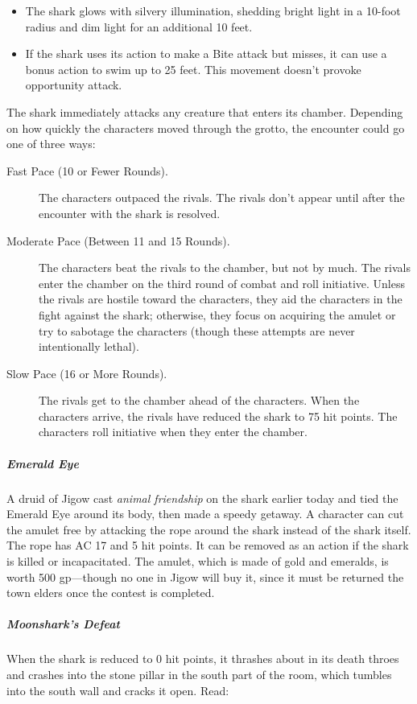 \documentclass[10pt,a4paper,twoside,fancy,bg=print,twocolumn,openany,nodeprecatedcode]{dndbook}
\begin{document}
\begin{itemize}
\item The shark glows with silvery illumination, shedding bright light in a 10-foot radius and dim light for an additional 10 feet.
\item If the shark uses its action to make a Bite attack but misses, it can use a bonus action to swim up to 25 feet. This movement doesn't provoke opportunity attack.
\end{itemize}

The shark immediately attacks any creature that enters its chamber. Depending on how quickly the characters moved through the grotto, the encounter could go one of three ways:


\begin{description}
\item[Fast Pace (10 or Fewer Rounds).]
The characters outpaced the rivals. The rivals don't appear until after the encounter with the shark is resolved.
\item[Moderate Pace (Between 11 and 15 Rounds).]
The characters beat the rivals to the chamber, but not by much. The rivals enter the chamber on the third round of combat and roll initiative. Unless the rivals are hostile toward the characters, they aid the characters in the fight against the shark; otherwise, they focus on acquiring the amulet or try to sabotage the characters (though these attempts are never intentionally lethal).
\item[Slow Pace (16 or More Rounds).]
The rivals get to the chamber ahead of the characters. When the characters arrive, the rivals have reduced the shark to 75 hit points. The characters roll initiative when they enter the chamber.
\end{description}

\subparagraph{Emerald Eye}
A druid of Jigow cast \textit{animal friendship} on the shark earlier today and tied the Emerald Eye around its body, then made a speedy getaway. A character can cut the amulet free by attacking the rope around the shark instead of the shark itself. The rope has AC 17 and 5 hit points. It can be removed as an action if the shark is killed or incapacitated. The amulet, which is made of gold and emeralds, is worth 500 gp—though no one in Jigow will buy it, since it must be returned the town elders once the contest is completed.

\subparagraph{Moonshark's Defeat}
When the shark is reduced to 0 hit points, it thrashes about in its death throes and crashes into the stone pillar in the south part of the room, which tumbles into the south wall and cracks it open. Read:
\end{document}
